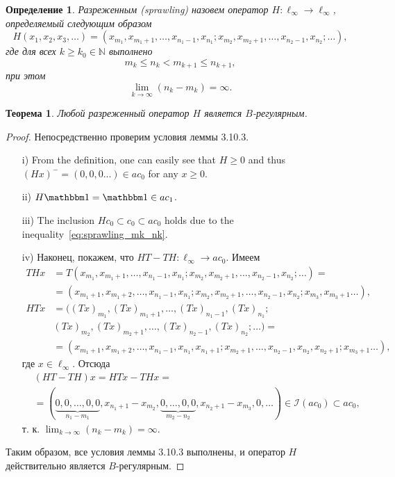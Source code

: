 \documentclass[a4paper,14pt]{article} %
\newcommand{\one}{\ensuremath{\mathbbm 1}}
\theoremstyle{plain}
\newtheorem{theorem}[lemma]{Теорема}
\newtheorem{definition}[lemma]{Определение}
\begin{document}
	\begin{definition}
		Разреженным (sprawling) назовем оператор $H: \ell_\infty \to \ell_\infty$,
		определяемый следующим образом
		$$
		H(x_1, x_2, x_3, \ldots) = (x_{m_1}, x_{m_1 + 1}, \ldots, x_{n_1 - 1}, x_{n_1};
		x_{m_2}, x_{m_2 + 1}, \ldots, x_{n_2 - 1}, x_{n_2}; \ldots),
		$$
		где для всех
		$k \geqslant k_0 \in \mathbb N$
		выполнено
		\begin{equation}
			\label{eq:sprawling_mk_nk}
			m_k \leqslant n_k < m_{k+1}\leqslant n_{k+1},
		\end{equation}
		при этом
		$$
			\lim\limits_{k \to \infty} (n_k - m_k) = \infty
			.
		$$
	\end{definition}



	\begin{theorem}
		\label{thm:sprawling_is_B-regular}
		Любой разреженный оператор $H$ является $B$-регулярным.
	\end{theorem}

	\begin{proof}
		Непосредственно проверим условия леммы 3.10.3.
		\begin{enumerate}
			\item[i)] From the definition, one can easily see that $H\geq 0$
			and thus $(Hx)^- = (0,0,0...)\in ac_0$ for any $x\geq 0$.
			\item[ii)] $H \one = \one \in ac_1$.
			\item[iii)] The inclusion $Hc_0 \subset c_0 \subset ac_0$ holds due to the inequality~\eqref{eq:sprawling_mk_nk}.
			\item[iv)] Наконец, покажем, что $HT - TH : \ell_\infty \to ac_0$. Имеем
			\begin{align*}
				THx &= T(x_{m_1}, x_{m_1 + 1}, \ldots, x_{n_1 - 1}, x_{n_1};
				x_{m_2}, x_{m_2 + 1}, \ldots, x_{n_2 - 1}, x_{n_2}; \ldots) = \\
				&= (x_{m_1 + 1}, x_{m_1 + 2}, \ldots, x_{n_1 - 1}, x_{n_1};
				x_{m_2}, x_{m_2 + 1}, \ldots, x_{n_2 - 1}, x_{n_2}; x_{m_3}, x_{m_3 + 1}\ldots), \\
				HTx &= ((Tx)_{m_1}, (Tx)_{m_1 + 1}, \ldots, (Tx)_{n_1 - 1}, (Tx)_{n_1}; \\
				&(Tx)_{m_2}, (Tx)_{m_2 + 1}, \ldots, (Tx)_{n_2 - 1}, (Tx)_{n_2}; \ldots) = \\
				&= (x_{m_1 + 1}, x_{m_1 + 2}, \ldots, x_{n_1 - 1}, x_{n_1}, x_{n_1 + 1}; x_{m_2 + 1},
				\ldots, x_{n_2 - 1}, x_{n_2}, x_{n_2 + 1}; x_{m_3 + 1} \ldots),
			\end{align*}
			где $x \in \ell_\infty$. Отсюда
			\begin{align*}
				&(HT - TH)x = HTx - THx = \\
				&= (\underbrace{0, 0, \ldots, 0, 0}_{n_1 - m_1}, x_{n_1 + 1} - x_{m_2}, \underbrace{0, \ldots,
					0, 0}_{m_2 - n_2}, x_{n_2 + 1} - x_{m_3}, 0, \ldots) \in \mathcal I(ac_0) \subset ac_0,
			\end{align*}
			т. к. $\lim_{k \to \infty} (n_k - m_k) = \infty$.
		\end{enumerate}

		Таким образом, все условия леммы 3.10.3 выполнены, и оператор $H$ действительно является $B$-регулярным.
	\end{proof}
\end{document}
